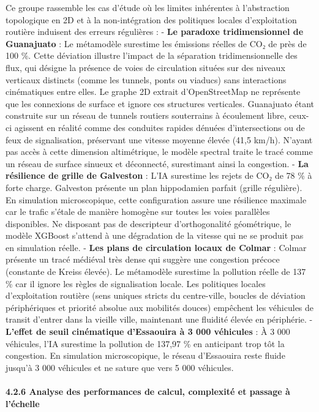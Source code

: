 \documentclass[10pt, a4paper]{article}
\begin{document}
Ce groupe rassemble les cas d'étude où les limites inhérentes à
l'abstraction topologique en 2D et à la non-intégration des politiques
locales d'exploitation routière induisent des erreurs régulières : -
\textbf{Le paradoxe tridimensionnel de Guanajuato} : Le métamodèle
surestime les émissions réelles de CO₂ de près de 100 \%. Cette
déviation illustre l'impact de la séparation tridimensionnelle des flux,
qui désigne la présence de voies de circulation situées sur des niveaux
verticaux distincts (comme les tunnels, ponts ou viaducs) sans
interactions cinématiques entre elles. Le graphe 2D extrait
d'OpenStreetMap ne représente que les connexions de surface et ignore
ces structures verticales. Guanajuato étant construite sur un réseau de
tunnels routiers souterrains à écoulement libre, ceux-ci agissent en
réalité comme des conduites rapides dénuées d'intersections ou de feux
de signalisation, préservant une vitesse moyenne élevée (41,5 km/h).
N'ayant pas accès à cette dimension altimétrique, le modèle spectral
traite le tracé comme un réseau de surface sinueux et déconnecté,
surestimant ainsi la congestion. - \textbf{La résilience de grille de
Galveston} : L'IA surestime les rejets de CO₂ de 78 \% à forte charge.
Galveston présente un plan hippodamien parfait (grille régulière). En
simulation microscopique, cette configuration assure une résilience
maximale car le trafic s'étale de manière homogène sur toutes les voies
parallèles disponibles. Ne disposant pas de descripteur d'orthogonalité
géométrique, le modèle XGBoost s'attend à une dégradation de la vitesse
qui ne se produit pas en simulation réelle. - \textbf{Les plans de
circulation locaux de Colmar} : Colmar présente un tracé médiéval très
dense qui suggère une congestion précoce (constante de Kreiss élevée).
Le métamodèle surestime la pollution réelle de 137 \% car il ignore les
règles de signalisation locale. Les politiques locales d'exploitation
routière (sens uniques stricts du centre-ville, boucles de déviation
périphériques et priorité absolue aux mobilités douces) empêchent les
véhicules de transit d'entrer dans la vieille ville, maintenant une
fluidité élevée en périphérie. - \textbf{L'effet de seuil cinématique
d'Essaouira à 3 000 véhicules} : À 3 000 véhicules, l'IA surestime la
pollution de 137,97 \% en anticipant trop tôt la congestion. En
simulation microscopique, le réseau d'Essaouira reste fluide jusqu'à 3
000 véhicules et ne sature que vers 5 000 véhicules.

\paragraph{4.2.6 Analyse des performances de calcul, complexité et
passage à
l'échelle}\label{analyse-des-performances-de-calcul-complexituxe9-et-passage-uxe0-luxe9chelle}
\end{document}
